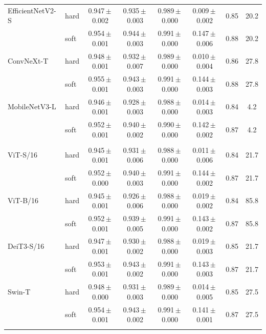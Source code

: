 \begin{table}[!htb]
{\begin{tabular}{llcccccc}
EfficientNetV2-S & hard & 0.947\,$\pm$\,0.002 & 0.935\,$\pm$\,0.003 & 0.989\,$\pm$\,0.000 & 0.009\,$\pm$\,0.002 & 0.85 & 20.2 \\
 & soft & 0.954\,$\pm$\,0.001 & 0.944\,$\pm$\,0.003 & 0.991\,$\pm$\,0.000 & 0.147\,$\pm$\,0.006 & 0.88 & 20.2 \\
ConvNeXt-T & hard & 0.948\,$\pm$\,0.001 & 0.932\,$\pm$\,0.007 & 0.989\,$\pm$\,0.000 & 0.010\,$\pm$\,0.004 & 0.86 & 27.8 \\
 & soft & 0.955\,$\pm$\,0.001 & 0.943\,$\pm$\,0.003 & 0.991\,$\pm$\,0.000 & 0.144\,$\pm$\,0.003 & 0.88 & 27.8 \\
MobileNetV3-L & hard & 0.946\,$\pm$\,0.001 & 0.928\,$\pm$\,0.003 & 0.988\,$\pm$\,0.000 & 0.014\,$\pm$\,0.003 & 0.84 & 4.2 \\
 & soft & 0.952\,$\pm$\,0.001 & 0.940\,$\pm$\,0.002 & 0.990\,$\pm$\,0.000 & 0.142\,$\pm$\,0.002 & 0.87 & 4.2 \\
\addlinespace
\multicolumn{8}{l}{\textit{Transformer}} \\
ViT-S/16 & hard & 0.945\,$\pm$\,0.001 & 0.931\,$\pm$\,0.006 & 0.988\,$\pm$\,0.000 & 0.011\,$\pm$\,0.006 & 0.84 & 21.7 \\
 & soft & 0.952\,$\pm$\,0.000 & 0.940\,$\pm$\,0.003 & 0.991\,$\pm$\,0.000 & 0.144\,$\pm$\,0.002 & 0.87 & 21.7 \\
ViT-B/16 & hard & 0.945\,$\pm$\,0.001 & 0.926\,$\pm$\,0.006 & 0.988\,$\pm$\,0.000 & 0.019\,$\pm$\,0.002 & 0.84 & 85.8 \\
 & soft & 0.952\,$\pm$\,0.001 & 0.939\,$\pm$\,0.005 & 0.991\,$\pm$\,0.000 & 0.143\,$\pm$\,0.002 & 0.87 & 85.8 \\
DeiT3-S/16 & hard & 0.947\,$\pm$\,0.001 & 0.930\,$\pm$\,0.002 & 0.988\,$\pm$\,0.000 & 0.019\,$\pm$\,0.003 & 0.85 & 21.7 \\
 & soft & 0.953\,$\pm$\,0.001 & 0.943\,$\pm$\,0.002 & 0.991\,$\pm$\,0.000 & 0.143\,$\pm$\,0.003 & 0.87 & 21.7 \\
Swin-T & hard & 0.948\,$\pm$\,0.000 & 0.931\,$\pm$\,0.003 & 0.989\,$\pm$\,0.000 & 0.014\,$\pm$\,0.005 & 0.85 & 27.5 \\
 & soft & 0.954\,$\pm$\,0.001 & 0.943\,$\pm$\,0.002 & 0.991\,$\pm$\,0.000 & 0.141\,$\pm$\,0.001 & 0.87 & 27.5 \\
\addlinespace
\bottomrule
\end{tabular}}
\end{table}
